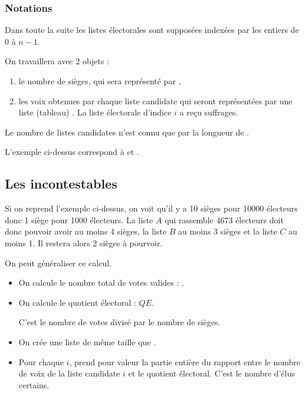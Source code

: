 \subsubsection{Notations}
Dans toute la suite les listes électorales sont supposées indexées par les entiers de 0 à $n-1$.

On travaillera avec 2 objets :
\begin{enumerate}
    \item le nombre de sièges, qui sera représenté par ,
    \item les voix obtenues par chaque liste candidate qui seront représentées par une liste (tableau) . La liste électorale d'indice $i$ a reçu  suffrages.
\end{enumerate}

Le nombre de listes candidates n'est connu que par la longueur de .

L'exemple ci-dessus correspond à  et .
\subsection{Les incontestables}
Si on reprend l'exemple ci-dessus, on voit qu'il y a 10 sièges pour 10000 électeurs donc 1 siège pour 1000 électeurs. La liste $A$ qui rassemble 4673 électeurs doit donc pouvoir avoir au moins 4 sièges, la liste $B$ au moins 3 sièges et la liste $C$ au moins 1. Il restera alors 2 sièges à pourvoir.

On peut généraliser ce calcul. 

\begin{itemize}
\item On calcule le nombre total de votes valides : .
\item On calcule le quotient électoral : $QE$.

C'est le nombre de votes divisé par le nombre de sièges.
\item On crée une liste   de même taille que .
\item Pour chaque $i$,  prend pour valeur la partie entière du rapport entre le nombre de voix de la liste candidate $i$ et le quotient électoral. C'est le nombre d'élus certains.
\end{itemize}

